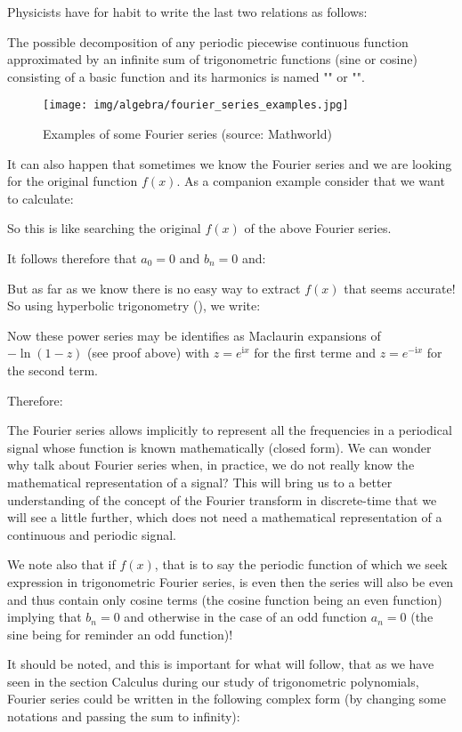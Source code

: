 	Physicists have for habit to write the last two relations as follows:
	
	The possible decomposition of any periodic piecewise continuous function approximated by an infinite sum of trigonometric functions (sine or cosine) consisting of a basic function and its harmonics is named "" or "".
	\begin{figure}[H]
		\centering
		\texttt{[image: img/algebra/fourier\_series\_examples.jpg]}
		\caption{Examples of some Fourier series (source: Mathworld)}
	\end{figure}
	It can also happen that sometimes we know the Fourier series and we are looking for the original function $f(x)$. As a companion example consider that we want to calculate:
	
	So this is like searching the original $f(x)$ of the above Fourier series.

	It follows therefore that $a_0=0$ and $b_n=0$ and:
	
	But as far as we know there is no easy way to extract $f(x)$ that seems accurate! So using hyperbolic trigonometry (), we write:
	
	Now these power series may be identifies as Maclaurin expansions of $-\ln(1-z)$ (see proof above) with $z=e^{\mathrm{i}x}$ for the first terme and $z=e^{-\mathrm{i}x}$ for the second term.

	Therefore:
	
	
	The Fourier series allows implicitly to represent all the frequencies in a periodical signal whose function is known mathematically (closed form). We can wonder why talk about Fourier series when, in practice, we do not really know the mathematical representation of a signal? This will bring us to a better understanding of the concept of the Fourier transform in discrete-time that we will see a little further, which does not need a mathematical representation of a continuous and periodic signal.
	
	We note also that if $f (x)$, that is to say the periodic function of which we seek expression in trigonometric Fourier series, is even then the series will also be even and thus contain only cosine terms (the cosine function being an even function) implying that $b_n=0$ and otherwise in the case of an odd function $a_n=0$ (the sine being for reminder an odd function)!
	
	It should be noted, and this is important for what will follow, that as we have seen in the section Calculus during our study of trigonometric polynomials, Fourier series could be written in the following complex form (by changing some notations and passing the sum to infinity):
	
